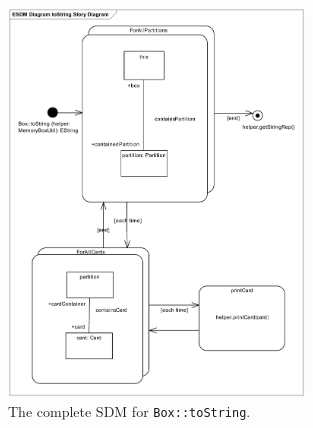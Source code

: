 \begin{figure}[htbp]
\begin{center}
  \includegraphics[width=0.7\textwidth]{pics/sdmBilder/toString/sdm76}
  \caption{The complete SDM for \texttt{Box::toString}.}  
  \label{fig:sdm_invert_5}
\end{center}
\end{figure}

\clearpage 